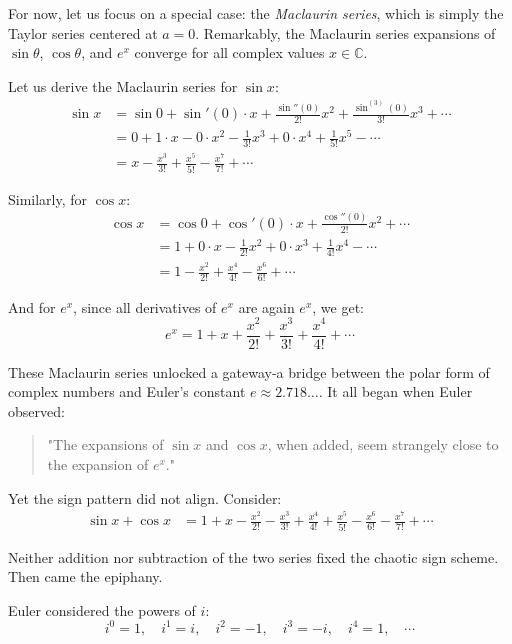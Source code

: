 For now, let us focus on a special case: the \emph{Maclaurin series}, which is simply the Taylor series centered at $a = 0$. Remarkably, the Maclaurin series expansions of $\sin \theta$, $\cos \theta$, and $e^x$ converge for all complex values $x \in \mathbb{C}$.

\vspace{1em}
Let us derive the Maclaurin series for $\sin x$:
\begin{align*}
\sin x &= \sin 0 + \sin'(0)\cdot x + \frac{\sin''(0)}{2!}x^2 + \frac{\sin^{(3)}(0)}{3!}x^3 + \dotsb \\
&= 0 + 1\cdot x - 0\cdot x^2 - \frac{1}{3!}x^3 + 0\cdot x^4 + \frac{1}{5!}x^5 - \dotsb \\
&= x - \frac{x^3}{3!} + \frac{x^5}{5!} - \frac{x^7}{7!} + \dotsb
\end{align*}

Similarly, for $\cos x$:
\begin{align*}
\cos x &= \cos 0 + \cos'(0)\cdot x + \frac{\cos''(0)}{2!}x^2 + \dotsb \\
&= 1 + 0\cdot x - \frac{1}{2!}x^2 + 0\cdot x^3 + \frac{1}{4!}x^4 - \dotsb \\
&= 1 - \frac{x^2}{2!} + \frac{x^4}{4!} - \frac{x^6}{6!} + \dotsb
\end{align*}

And for $e^x$, since all derivatives of $e^x$ are again $e^x$, we get:
\[
e^x = 1 + x + \frac{x^2}{2!} + \frac{x^3}{3!} + \frac{x^4}{4!} + \dotsb
\]

\vspace{1em}
These Maclaurin series unlocked a gateway-a bridge between the polar form of complex numbers and Euler's constant $e \approx 2.718\ldots$. It all began when Euler observed:

\begin{quote}
"The expansions of $\sin x$ and $\cos x$, when added, seem strangely close to the expansion of $e^x$."
\end{quote}

Yet the sign pattern did not align. Consider:
\begin{align}
\sin x + \cos x &= 1 + x - \frac{x^2}{2!} - \frac{x^3}{3!} + \frac{x^4}{4!} + \frac{x^5}{5!} - \frac{x^6}{6!} - \frac{x^7}{7!} + \dotsb \tag{1.4}
\end{align}

Neither addition nor subtraction of the two series fixed the chaotic sign scheme. Then came the epiphany.

\vspace{1em}
Euler considered the powers of $i$:
\[
i^0 = 1,\quad i^1 = i,\quad i^2 = -1,\quad i^3 = -i,\quad i^4 = 1,\quad \dotsb
\]

